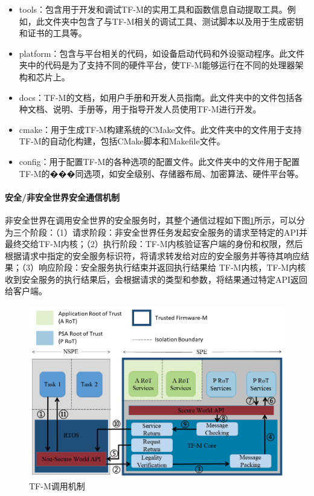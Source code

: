 \documentclass[12pt,a4paper]{ctexart}
\numberwithin{figure}{section}
\begin{document}
\begin{itemize}
    \item tools：包含用于开发和调试TF-M的实用工具和函数信息自动提取工具。例如，此文件夹中包含了与TF-M相关的调试工具、测试脚本以及用于生成密钥和证书的工具等。
    \item platform：包含与平台相关的代码，如设备启动代码和外设驱动程序。此文件夹中的代码是为了支持不同的硬件平台，使TF-M能够运行在不同的处理器架构和芯片上。
    \item docs：TF-M的文档，如用户手册和开发人员指南。此文件夹中的文件包括各种文档、说明、手册等，用于指导开发人员使用TF-M进行开发。
    \item cmake：用于生成TF-M构建系统的CMake文件。此文件夹中的文件用于支持TF-M的自动化构建，包括CMake脚本和Makefile文件。
    \item config：用于配置TF-M的各种选项的配置文件。此文件夹中的文件用于配置TF-M的���同选项，如安全级别、存储器布局、加密算法、硬件平台等。
\end{itemize}

\paragraph{安全/非安全世界安全通信机制}
非安全世界在调用安全世界的安全服务时，其整个通信过程如下图\ref{TF-M Secure communication processes}所示，可以分为三个阶段：（1）请求阶段：非安全世界任务发起安全服务的请求至特定的API并最终交给TF-M内核；（2）执行阶段：TF-M内核验证客户端的身份和权限，然后根据请求中指定的安全服务标识符，将请求转发给对应的安全服务并等待其响应结果；（3）响应阶段：安全服务执行结束并返回执行结果给 TF-M内核，TF-M内核收到安全服务的执行结果后，会根据请求的类型和参数，将结果通过特定API返回给客户端。
\begin{figure}
    \centering
    \includegraphics[scale=0.38]{graph/TF-M Secure communication process.png}
    \caption{TF-M调用机制}
    \label{TF-M Secure communication processes}
\end{figure}
\end{document}
